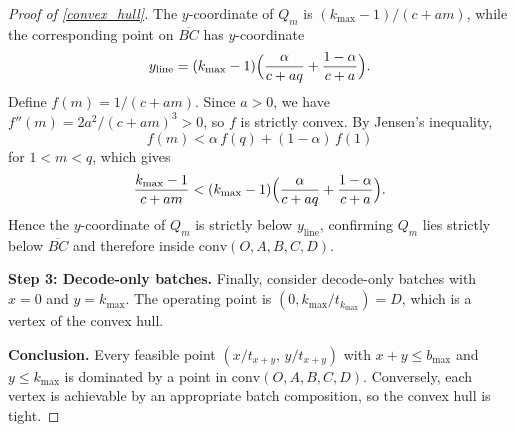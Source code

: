 \documentclass[10pt,a4paper]{amsart}
\begin{document}
\begin{proof}[Proof of \cref{convex_hull}]
The \( y \)-coordinate of \( Q_m \) is \( (k_{\max} - 1)/(c + am) \), while the corresponding point on \( \overline{BC} \) has \( y \)-coordinate
\[
y_{\mathrm{line}} = (k_{\max} - 1) \Bigl( \frac{\alpha}{c + aq} + \frac{1 - \alpha}{c + a} \Bigr).
\]
Define \( f(m) = 1/(c + am) \). Since \( a > 0 \), we have \( f''(m) = 2a^2/(c + am)^3 > 0 \), so \( f \) is strictly convex. By Jensen's inequality,
\[
f(m) < \alpha\, f(q) + (1 - \alpha)\, f(1)
\]
for \( 1 < m < q \), which gives
\[
\frac{k_{\max} - 1}{c + am} < (k_{\max} - 1) \Bigl( \frac{\alpha}{c + aq} + \frac{1 - \alpha}{c + a} \Bigr).
\]
Hence the \( y \)-coordinate of \( Q_m \) is strictly below \( y_{\mathrm{line}} \), confirming \( Q_m \) lies strictly below \( \overline{BC} \) and therefore inside \( \mathrm{conv}(O, A, B, C, D) \).

\textbf{Step 3: Decode-only batches.} Finally, consider decode-only batches with \( x = 0 \) and \( y = k_{\max} \). The operating point is \( (0, k_{\max}/t_{k_{\max}}) = D \), which is a vertex of the convex hull.

\textbf{Conclusion.} Every feasible point \( (x/t_{x+y},\, y/t_{x+y}) \) with \( x + y \le b_{\max} \) and \( y \le k_{\max} \) is dominated by a point in \( \mathrm{conv}(O, A, B, C, D) \). Conversely, each vertex is achievable by an appropriate batch composition, so the convex hull is tight.
\end{proof}
\end{document}
